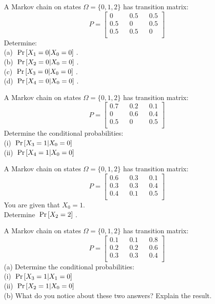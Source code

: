\frmrule

\begin{example}
A Markov chain on states $\Omega = \{0,1,2\}$ has transition matrix:
$$ P = 
\begin{bmatrix} 
0 && 0.5 && 0.5 \\ 
0.5 && 0 && 0.5 \\
0.5 && 0.5 && 0 \\
\end{bmatrix}
$$
Determine: \\
(a) $\;\text{Pr}\left[X_1 = 0 | X_0 = 0\right]\;$.\\
(b) $\;\text{Pr}\left[X_2 = 0 | X_0 = 0\right]\;$.\\
(c) $\;\text{Pr}\left[X_3 = 0 | X_0 = 0\right]\;$.\\
(d) $\;\text{Pr}\left[X_4 = 0 | X_0 = 0\right]\;$.
\end{example}

\frmrule

\begin{example}
A Markov chain on states $\Omega = \{0,1,2\}$ has transition matrix:
$$ P = 
\begin{bmatrix} 
0.7 && 0.2 && 0.1 \\ 
0   && 0.6 && 0.4 \\
0.5 && 0 && 0.5 \\
\end{bmatrix}
$$
Determine the conditional probabilities:\\
(i) $\;\text{Pr}\left[X_3 = 1 | X_0 = 0\right]\;$ \\
(ii) $\;\text{Pr}\left[X_4 = 1 | X_0 = 0\right]\;$ 
\end{example}

\frmrule


\begin{example}
A Markov chain on states $\Omega = \{0,1,2\}$ has transition matrix:
$$ P = 
\begin{bmatrix} 
0.6 && 0.3 && 0.1 \\ 
0.3 && 0.3 && 0.4 \\
0.4 && 0.1 && 0.5 \\
\end{bmatrix}
$$
You are given that $X_0 = 1$. \\
Determine $\;\text{Pr}\left[X_2 = 2\right]\;$. 
\end{example}

\frmrule


\begin{example}
A Markov chain on states $\Omega = \{0,1,2\}$ has transition matrix:
$$ P = 
\begin{bmatrix} 
0.1 && 0.1 && 0.8 \\ 
0.2 && 0.2 && 0.6 \\
0.3 && 0.3 && 0.4 \\
\end{bmatrix}
$$
(a) Determine the conditional probabilities:\\
(i) $\;\text{Pr}\left[X_3 = 1 | X_1 = 0\right]\;$ \\
(ii) $\;\text{Pr}\left[X_2 = 1 | X_0 = 0\right]\;$ \\
(b) What do you notice about these two answers? Explain the result. 
\end{example}


